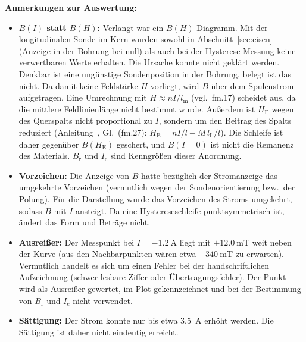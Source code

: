 \documentclass[a4paper,11pt]{article}
\begin{document}
\textbf{Anmerkungen zur Auswertung:}
\begin{itemize}
  \item \textbf{$B(I)$ statt $B(H)$:} Verlangt war ein $B(H)$-Diagramm.
        Mit der longitudinalen Sonde im Kern wurden sowohl in
        Abschnitt~\ref{sec:eisen} (Anzeige in der Bohrung bei null) als auch
        bei der Hysterese-Messung keine verwertbaren Werte erhalten. Die
        Ursache konnte nicht geklärt werden.
        Denkbar ist eine ungünstige Sondenposition in der Bohrung, belegt ist
        das nicht. Da damit keine Feldstärke $H$ vorliegt, wird $B$ über dem
        Spulenstrom aufgetragen. Eine Umrechnung mit $H\approx nI/l_\mathrm{m}$
        (vgl.\ fm.17) scheidet aus, da die mittlere Feldlinienlänge nicht
        bestimmt wurde. Außerdem ist $H_\mathrm{E}$ wegen des Querspalts nicht
        proportional zu $I$, sondern um den Beitrag des Spalts reduziert
        (Anleitung~\cite{anleitung}, Gl.~(fm.27):
        $H_\mathrm{E}=nI/l-M\,l_\mathrm{L}/l$). Die Schleife ist daher
        gegenüber $B(H_\mathrm{E})$ geschert, und $B(I{=}0)$ ist nicht die
        Remanenz des Materials. $B_\mathrm{r}$ und $I_\mathrm{c}$ sind
        Kenngrößen dieser Anordnung.
  \item \textbf{Vorzeichen:} Die Anzeige von $B$ hatte bezüglich der
        Stromanzeige das umgekehrte Vorzeichen (vermutlich wegen der
        Sondenorientierung bzw.\ der Polung). Für die Darstellung wurde das
        Vorzeichen des Stroms umgekehrt, sodass $B$ mit $I$ ansteigt. Da eine
        Hystereseschleife punktsymmetrisch ist, ändert das Form und Beträge
        nicht.
  \item \textbf{Ausreißer:} Der Messpunkt bei $I=-\SI{1.2}{\ampere}$ liegt mit
        $+\SI{12.0}{\milli\tesla}$ weit neben der Kurve (aus den Nachbarpunkten
        wären etwa $-\SI{340}{\milli\tesla}$ zu erwarten). Vermutlich handelt es
        sich um einen Fehler bei der handschriftlichen Aufzeichnung (schwer
        lesbare Ziffer oder Übertragungsfehler). Der Punkt wird als Ausreißer
        gewertet, im Plot gekennzeichnet und bei der Bestimmung von
        $B_\mathrm{r}$ und $I_\mathrm{c}$ nicht verwendet.
  \item \textbf{Sättigung:} Der Strom konnte nur bis etwa \SI{3.5}{\ampere}
        erhöht werden. Die Sättigung ist daher nicht eindeutig erreicht.
\end{itemize}

\clearpage

\end{document}
